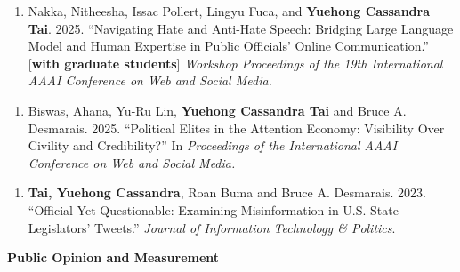 \documentclass[10.5pt,]{article}
\providecommand{\tightlist}{%
	\setlength{\itemsep}{0pt}\setlength{\parskip}{0pt}}
\renewenvironment{itemize}{
	\begin{list}{}{
			\setlength{\leftmargin}{1.5em}
		}
	}{
	\end{list}
}
\begin{document}
\begin{itemize}
\begin{itemize}
\begin{enumerate}
    \def\labelenumi{\arabic{enumi}.}
    \setcounter{enumi}{13}
    \tightlist
    \item
      Nakka, Nitheesha, Issac Pollert, Lingyu Fuca, and \textbf{Yuehong
      Cassandra Tai}. 2025. ``Navigating Hate and Anti-Hate Speech:
      Bridging Large Language Model and Human Expertise in Public
      Oﬀicials' Online Communication.'' {[}\textbf{with graduate
      students}{]} \emph{Workshop Proceedings of the 19th International
      AAAI Conference on Web and Social Media.}
    \end{enumerate}
  \item
    \begin{enumerate}
    \def\labelenumi{\arabic{enumi}.}
    \setcounter{enumi}{12}
    \tightlist
    \item
      Biswas, Ahana, Yu-Ru Lin, \textbf{Yuehong Cassandra Tai} and Bruce
      A. Desmarais. 2025. ``Political Elites in the Attention Economy:
      Visibility Over Civility and Credibility?'' In \emph{Proceedings
      of the International AAAI Conference on Web and Social Media.}
    \end{enumerate}
  \item
    \begin{enumerate}
    \def\labelenumi{\arabic{enumi}.}
    \setcounter{enumi}{11}
    \tightlist
    \item
      \textbf{Tai, Yuehong Cassandra}, Roan Buma and Bruce A. Desmarais.
      2023. ``Oﬀicial Yet Questionable: Examining Misinformation in U.S.
      State Legislators' Tweets.'' \emph{Journal of Information
      Technology \& Politics}.
    \end{enumerate}
  \end{itemize}
\item
  \textbf{Public Opinion and Measurement}


\end{itemize}
\end{document}
